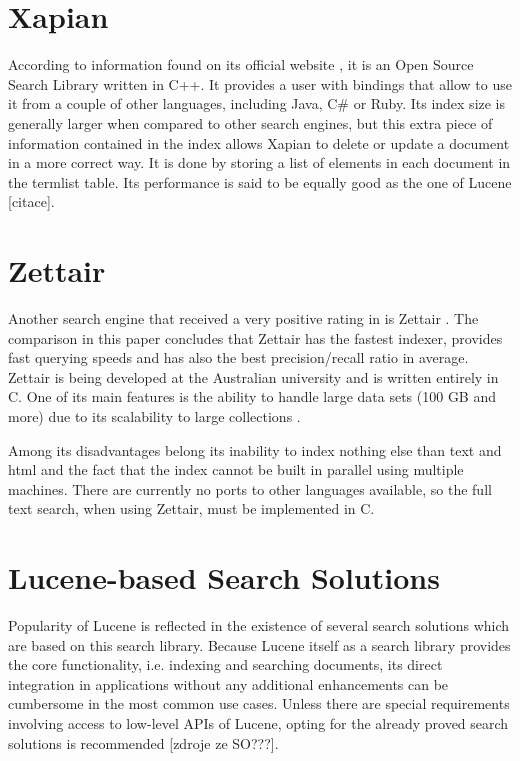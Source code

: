 \section{Xapian}

According to information found on its official website \cite{XapianHome},
it is an Open Source Search Library written in C++. 
It provides a user with bindings that allow to use it from a couple of other languages,
including Java, C\# or Ruby. 
Its index size is generally larger when compared to other search engines, but this extra piece of information contained in the index allows Xapian to delete or update a document in a more correct way. 
It is done by storing a list of elements in each document in the termlist table\cite{XapianIndexSize}. 
Its performance is said to be equally good as the one of Lucene {[}citace{]}.


\section{Zettair}

Another search engine that received a very positive rating in \cite{MiddletonBaeza} is Zettair \cite{ZettairHome}. 
The comparison in this paper concludes that Zettair has the fastest indexer, provides fast querying speeds and has also the best precision/recall ratio in average. 
Zettair is being developed at the Australian university and is written entirely
in C. 
One of its main features is the ability to handle large data
sets (100 GB and more) due to its scalability to large collections \cite{ZettairHome}.

Among its disadvantages belong its inability to index nothing else than text and html and the fact that the index cannot be built in
parallel using multiple machines. 
There are currently no ports to other languages available, so the full text search, when using Zettair, must be implemented in C.



\section{Lucene-based Search Solutions}
\label{sec:luceneBasedSolutions}

Popularity of Lucene is reflected in the existence of several search solutions which are based on this search library.
Because Lucene itself as a search library provides the core functionality, i.e. indexing and searching documents, its direct integration in applications without any additional enhancements can be cumbersome in the most common use cases.
Unless there are special requirements involving access to low-level APIs of Lucene, opting for the already proved search solutions is recommended [zdroje ze SO???].

